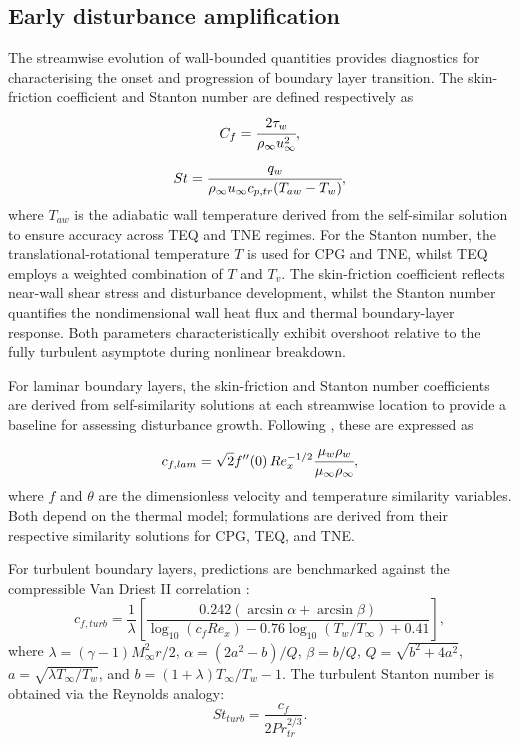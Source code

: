 \subsection{Early disturbance amplification}
The streamwise evolution of wall-bounded quantities provides diagnostics for characterising the onset and progression of boundary layer transition. The skin-friction coefficient and Stanton number are defined respectively as
\begin{equation}
    C_f = \cfrac{2\tau_w}{\rho_\infty u_\infty^2},
\end{equation}
\begin{equation}
    St = \cfrac{q_w}{\rho_\infty u_\infty c_{p,tr} (T_{aw}-T_w)},
\end{equation}
where $T_{aw}$ is the adiabatic wall temperature derived from the self-similar solution to ensure accuracy across \gls{TEQ} and \gls{TNE} regimes. For the Stanton number, the translational-rotational temperature $T$ is used for \gls{CPG} and \gls{TNE}, whilst \gls{TEQ} employs a weighted combination of $T$ and $T_v$. The skin-friction coefficient reflects near-wall shear stress and disturbance development, whilst the Stanton number quantifies the nondimensional wall heat flux and thermal boundary-layer response. Both parameters characteristically exhibit overshoot relative to the fully turbulent asymptote during nonlinear breakdown.

For laminar boundary layers, the skin-friction and Stanton number coefficients are derived from self-similarity solutions at each streamwise location to provide a baseline for assessing disturbance growth. Following \citet{White2005}, these are expressed as
\begin{equation}
c_{f,lam} = \sqrt{2} f''(0) \,Re_x^{-1/2}\cfrac{\mu_w \rho_w}{\mu_\infty \rho_\infty},
\end{equation}
where $f$ and $\theta$ are the dimensionless velocity and temperature similarity variables. Both depend on the thermal model; formulations are derived from their respective similarity solutions for \gls{CPG}, \gls{TEQ}, and \gls{TNE}.

For turbulent boundary layers, predictions are benchmarked against the compressible Van Driest II correlation \citep{Sandhametal2014}:
\begin{equation}
    c_{f,turb} = \frac{1}{\lambda} \left[ \frac{0.242 \left( \arcsin\alpha + \arcsin\beta \right)}{\log_{10}(c_f Re_x) - 0.76 \log_{10}(T_w/T_\infty) + 0.41} \right],
\end{equation}
where $\lambda = (\gamma - 1) M_\infty^2 r/2$, $\alpha = (2a^2 - b)/Q$, $\beta = b/Q$, $Q = \sqrt{b^2 + 4a^2}$, $a = \sqrt{\lambda T_\infty/T_w}$, and $b = (1+\lambda)T_\infty/T_w - 1$. The turbulent Stanton number is obtained via the Reynolds analogy:
\begin{equation}
St_{turb} = \frac{c_f}{2Pr_{tr}^{2/3}}.
\end{equation}

